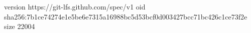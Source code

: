 version https://git-lfs.github.com/spec/v1
oid sha256:7b1ce74274e1e5be6e7315a16988bc5d53bcf0d003427bcc71bc426c1ce73f2e
size 22004
